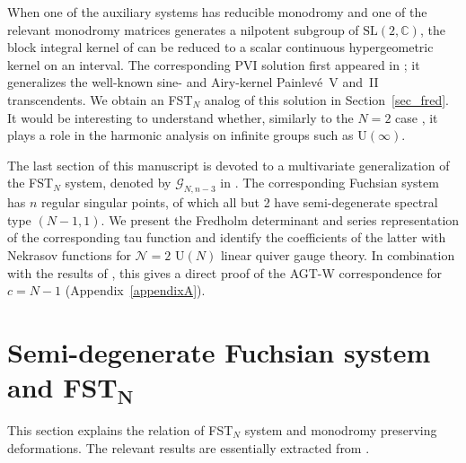 \documentclass[pdftex]{sigma}
\newcommand\Cb{\mathbb{C}}
\numberwithin{equation}{section}
\begin{document}
When one of the auxiliary systems has reducible monodromy and one of the relevant monodromy matrices generates a nilpotent subgroup of $\mathrm{SL}(2,\Cb)$, the block integral kernel of \cite[Theorem~A]{GL16} can be reduced to a scalar continuous hypergeometric kernel on an interval. The corresponding PVI solution first appeared in \cite{BD}; it generalizes the well-known sine- and Airy-kernel Painlev\'e~V and~II transcendents. We obtain an FST$_N$ analog of this solution in Section~\ref{sec_fred}. It would be interesting to understand whether, similarly to the $N=2$ case \cite{BO}, it plays a role in the harmonic analysis on infinite groups such as $\mathrm{U}(\infty)$.

The last section of this manuscript is devoted to a multivariate generalization of the FST$_N$ system, denoted by $\mathcal G_{N,n-3}$ in \cite{Tsuda}. The corresponding Fuchsian system has $n$ regular singular points, of which all but 2 have semi-degenerate spectral type $(N-1,1)$. We present the Fredholm determinant and series representation of the corresponding tau function and identify the coefficients of the latter with Nekrasov functions \cite{Nekrasov} for $\mathcal N=2$ $\mathrm{U}(N)$ linear quiver gauge theory. In combination with the results of \cite{GIL18}, this gives a direct proof of the AGT-W correspondence for $c=N-1$ (Appendix~\ref{appendixA}).

\section[Semi-degenerate Fuchsian system and FST$_N$]{Semi-degenerate Fuchsian system and FST$\boldsymbol{{}_N}$}
This section explains the relation of FST$_N$ system and monodromy preserving deformations. The relevant results are essentially extracted from \cite{Tsuda}.
\end{document}
